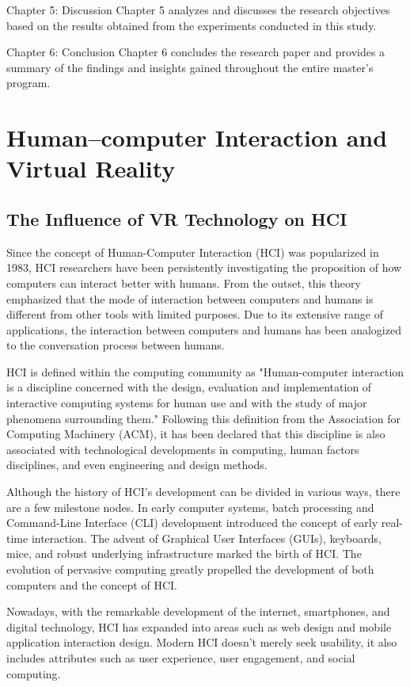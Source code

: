 Chapter 5: Discussion
Chapter 5 analyzes and discusses the research objectives based on the results obtained from the experiments conducted in this study.

Chapter 6: Conclusion
Chapter 6 concludes the research paper and provides a summary of the findings and insights gained throughout the entire master's program.

\section{Human–computer Interaction and Virtual Reality}
\subsection{The Influence of VR Technology on HCI}
Since the concept of Human-Computer Interaction (HCI) was popularized in 1983, HCI researchers have been persistently investigating the proposition of how computers can interact better with humans. From the outset, this theory emphasized that the mode of interaction between computers and humans is different from other tools with limited purposes. Due to its extensive range of applications, the interaction between computers and humans has been analogized to the conversation process between humans.

HCI is defined within the computing community\cite{paper3} as "Human-computer interaction is a discipline concerned with the design, evaluation and implementation of interactive computing systems for human use and with the study of major phenomena surrounding them." Following this definition from the Association for Computing Machinery (ACM), it has been declared that this discipline is also associated with technological developments in computing, human factors disciplines, and even engineering and design methods.

Although the history of HCI's development can be divided in various ways\cite{paper4}, there are a few milestone nodes. In early computer systems, batch processing\cite{paper5e} and Command-Line Interface (CLI) development introduced the concept of early real-time interaction\cite{paper6e}. The advent of Graphical User Interfaces (GUIs), keyboards, mice, and robust underlying infrastructure marked the birth of HCI. The evolution of pervasive computing\cite{paper7} greatly propelled the development of both computers and the concept of HCI.

Nowadays, with the remarkable development of the internet, smartphones, and digital technology, HCI has expanded into areas such as web design and mobile application interaction design. Modern HCI doesn't merely seek usability, it also includes attributes such as user experience\cite{paper8e}, user engagement, and social computing. 

